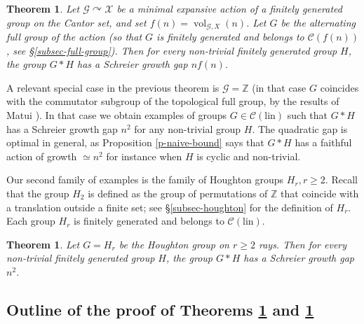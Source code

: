 \documentclass[11pt]{amsart}
\newcommand{\Z}{\ensuremath{\mathbb{Z}}}%
\newcommand{\Gcal}{\ensuremath{\mathcal{G}}}%
\newcommand{\vol}{\ensuremath{\operatorname{vol}}}%
\newcommand{\acts}{\ensuremath{\curvearrowright}}%
\newcommand{\Class}{\ensuremath{\mathcal{C}}}
\newcommand{\Clin}{\ensuremath{\mathcal{C}(\mathrm{lin})}}
\theoremstyle{definition}
\theoremstyle{plain}
\newtheorem{thm-intro}[defin]{Theorem}
\theoremstyle{remark}
\begin{document}
\begin{thm-intro} \label{t-intro-full}
Let $\Gcal \acts  \mathcal{X}$ be a minimal expansive action of a finitely generated group on the Cantor set, and set $f(n)=\vol_{\Gcal, X}(n)$. Let $G$ be the alternating full group of the action (so that $G$ is finitely generated and belongs to $\Class(f(n))$, see \S \ref{subsec-full-group}). Then for every non-trivial finitely generated group $H$, the group $G\ast H$ has a Schreier growth gap $nf(n)$. 
\end{thm-intro} 



A relevant special case in the previous theorem is $\mathcal{G}=\Z$ (in that case $G$ coincides with the commutator subgroup of the topological full group, by the results of Matui \cite{Mat-simple}). In that case we obtain examples of groups $G\in \Clin$ such that $G\ast H$ has a Schreier growth gap $n^2$ for any non-trivial group $H$. The quadratic gap is optimal in general, as Proposition \ref{p-naive-bound}  says that $G\ast H$ has a faithful action of growth $\simeq n^2$ for instance when $H$ is cyclic and non-trivial.



Our second family of examples is the family of Houghton groups $H_r, r\ge 2$. Recall that the group $H_2$ is defined as the group of permutations of $\Z$ that coincide with a translation outside a finite set; see \S \ref{subsec-houghton} for the definition of $H_r$. Each group $H_r$ is finitely generated and belongs to $\Clin$.

\begin{thm-intro} \label{t-intro-Houghton}
Let $G=H_r$ be the Houghton group on $r\ge 2$ rays. Then  for every non-trivial finitely generated group $H$, the group $G\ast H$ has a Schreier growth gap $n^2$. 
\end{thm-intro}

\subsection{Outline of the proof of Theorems \ref{t-intro-full} and \ref{t-intro-Houghton}}
\end{document}
